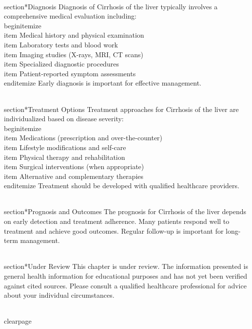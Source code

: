 \\section*{Diagnosis}
Diagnosis of Cirrhosis of the liver typically involves a comprehensive medical evaluation including:
\\begin{itemize}
  \\item Medical history and physical examination
  \\item Laboratory tests and blood work
  \\item Imaging studies (X-rays, MRI, CT scans)
  \\item Specialized diagnostic procedures
  \\item Patient-reported symptom assessments
\\end{itemize}
Early diagnosis is important for effective management.

\\section*{Treatment Options}
Treatment approaches for Cirrhosis of the liver are individualized based on disease severity:
\\begin{itemize}
  \\item Medications (prescription and over-the-counter)
  \\item Lifestyle modifications and self-care
  \\item Physical therapy and rehabilitation
  \\item Surgical interventions (when appropriate)
  \\item Alternative and complementary therapies
\\end{itemize}
Treatment should be developed with qualified healthcare providers.

\\section*{Prognosis and Outcomes}
The prognosis for Cirrhosis of the liver depends on early detection and treatment adherence. Many patients respond well to treatment and achieve good outcomes. Regular follow-up is important for long-term management.

\\section*{Under Review}
This chapter is under review. The information presented is general health information for educational purposes and has not yet been verified against cited sources. Please consult a qualified healthcare professional for advice about your individual circumstances.

\\clearpage
